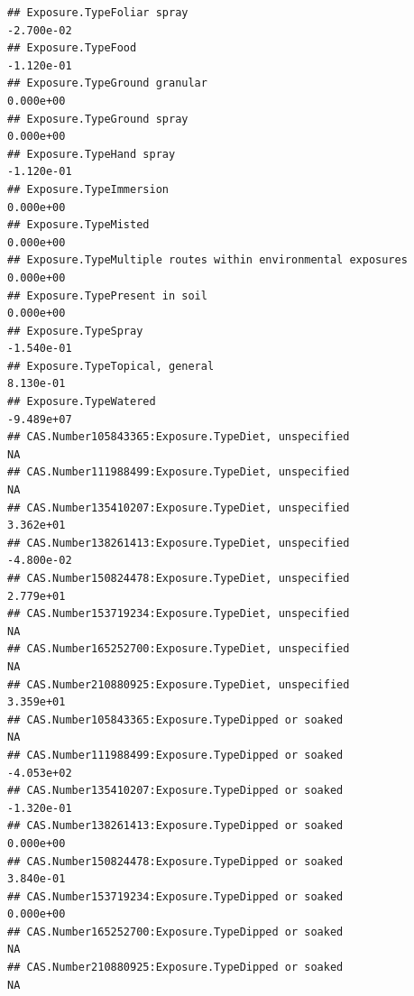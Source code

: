 \documentclass[
  12pt,
]{article}
\begin{document}
\begin{verbatim}
## Exposure.TypeFoliar spray                                                       -2.700e-02
## Exposure.TypeFood                                                               -1.120e-01
## Exposure.TypeGround granular                                                     0.000e+00
## Exposure.TypeGround spray                                                        0.000e+00
## Exposure.TypeHand spray                                                         -1.120e-01
## Exposure.TypeImmersion                                                           0.000e+00
## Exposure.TypeMisted                                                              0.000e+00
## Exposure.TypeMultiple routes within environmental exposures                      0.000e+00
## Exposure.TypePresent in soil                                                     0.000e+00
## Exposure.TypeSpray                                                              -1.540e-01
## Exposure.TypeTopical, general                                                    8.130e-01
## Exposure.TypeWatered                                                            -9.489e+07
## CAS.Number105843365:Exposure.TypeDiet, unspecified                                      NA
## CAS.Number111988499:Exposure.TypeDiet, unspecified                                      NA
## CAS.Number135410207:Exposure.TypeDiet, unspecified                               3.362e+01
## CAS.Number138261413:Exposure.TypeDiet, unspecified                              -4.800e-02
## CAS.Number150824478:Exposure.TypeDiet, unspecified                               2.779e+01
## CAS.Number153719234:Exposure.TypeDiet, unspecified                                      NA
## CAS.Number165252700:Exposure.TypeDiet, unspecified                                      NA
## CAS.Number210880925:Exposure.TypeDiet, unspecified                               3.359e+01
## CAS.Number105843365:Exposure.TypeDipped or soaked                                       NA
## CAS.Number111988499:Exposure.TypeDipped or soaked                               -4.053e+02
## CAS.Number135410207:Exposure.TypeDipped or soaked                               -1.320e-01
## CAS.Number138261413:Exposure.TypeDipped or soaked                                0.000e+00
## CAS.Number150824478:Exposure.TypeDipped or soaked                                3.840e-01
## CAS.Number153719234:Exposure.TypeDipped or soaked                                0.000e+00
## CAS.Number165252700:Exposure.TypeDipped or soaked                                       NA
## CAS.Number210880925:Exposure.TypeDipped or soaked                                       NA

\end{verbatim}
\end{document}
